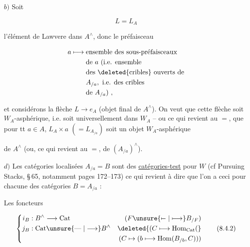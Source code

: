 $b)$ Soit

\[
 L=L_A \tag*{(8.4.1)}
\]

l'élément de Lawvere dans $A^\wedge$, donc le préfaisceau

\[
 \begin{aligned}
 a\longmapsto{}&\text{ensemble des sous-préfaisceaux}\\
 &\text{de } a\ \text{(i.e. ensemble}\\
 &\text{des \deleted{cribles} ouverts de}\\
 & A_{/a},\ \text{i.e. des cribles}\\
 &\text{de } A_{/a})\ ,
 \end{aligned}
\]

et considérons la flèche $L\longrightarrow e_A$ (objet final de $A^\wedge$). On veut que cette flèche soit 
$W_A$-asphérique, i.e. soit universellement dans $W_A$ -- ou ce qui revient au $=$, que pour tt $a\in A$, $L_A\times a$
$(=L_{A_{/a}})$ soit un objet $W_A$-asphérique

de $A^\wedge$ (ou, ce qui revient au $=$,  de $(A_{/a})^\wedge$).


$d)$ Les catégories localisées $A_{/a}=B$ sont des
\uline{catégories-test} pour $W$ (cf Pursuing Stacks, \S\,65, notamment pages 172--173)
ce qui revient à dire que l'on a ceci pour chacune des  catégories $B=A_{/a}$ :


 Les foncteurs

\[
 \left\{\begin{aligned}
 i_B &: B^\wedge\longrightarrow\mathrm{Cat}
 & (F\unsure{\mapstochar\relbar|\longmapsto} B_{/F})\\
 j_B &: \mathrm{Cat}\unsure{\mathrel{\text{---}}|\longrightarrow} B^\wedge
 &\deleted{(C\longmapsto\mathrm{Hom}_{\mathrm{Cat}}(}\\
 &&(C\mapsto(b\longmapsto\mathrm{Hom}(B_{/b},C)))
 \end{aligned}\right.
 \tag*{(8.4.2)}
\]


